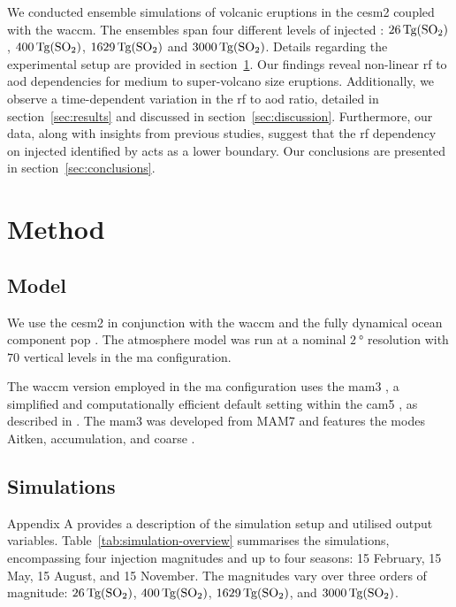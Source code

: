 \documentclass{ametsocV6.1}
\newcommand{\iso}[1][i]{{#1}njected \ce{SO2}}
\begin{document}
We conducted ensemble simulations of volcanic eruptions in the \gls{cesm2} coupled with
the \gls{waccm}. The ensembles span four different levels of \iso{}:
\(\SI{26}{\tera\gram(\ce{SO2})}\), \(\SI{400}{\tera\gram(\ce{SO2})}\),
\(\SI{1629}{\tera\gram(\ce{SO2})}\) and \(\SI{3000}{\tera\gram(\ce{SO2})}\). Details
regarding the experimental setup are provided in section~\ref{sec:method}. Our findings
reveal non-linear \gls{rf} to \gls{aod} dependencies for medium to super-volcano size
eruptions. Additionally, we observe a time-dependent variation in the \gls{rf} to
\gls{aod} ratio, detailed in section~\ref{sec:results} and discussed in
section~\ref{sec:discussion}. Furthermore, our data, along with insights from previous
studies, suggest that the \gls{rf} dependency on \iso{} identified by
\citet{niemeier2015} acts as a lower boundary. Our conclusions are presented in
section~\ref{sec:conclusions}.

\section{Method}\label{sec:method}

\subsection{Model}

We use the \gls{cesm2} \citep{danabasoglu2020} in conjunction with the \gls{waccm}
\citep{gettleman2019} and the fully dynamical ocean component \gls{pop}
\citep{smith2010, danabasoglu2020}. The atmosphere model was run at a nominal
\(\SI{2}{\degree}\) resolution with \(70\) vertical levels in the \gls{ma}
configuration.

The \gls{waccm} version employed in the \gls{ma} configuration uses the \gls{mam3}
\citep{gettleman2019}, a simplified and computationally efficient default setting within
the \gls{cam5} \citep{liu2016}, as described in \citet{liu2012}. The \gls{mam3} was
developed from MAM7 and features the modes Aitken, accumulation, and coarse
\citep{liu2016}.

\subsection{Simulations}

Appendix A provides a description of the simulation setup and utilised output variables.
Table~\ref{tab:simulation-overview} summarises the simulations, encompassing four
 injection magnitudes and up to four seasons: 15 February, 15 May, 15 August,
and 15 November. The magnitudes vary over three orders of magnitude:
\(\SI{26}{\tera\gram(\ce{SO2})}\), \(\SI{400}{\tera\gram(\ce{SO2})}\),
\(\SI{1629}{\tera\gram(\ce{SO2})}\), and \(\SI{3000}{\tera\gram(\ce{SO2})}\).
\end{document}
